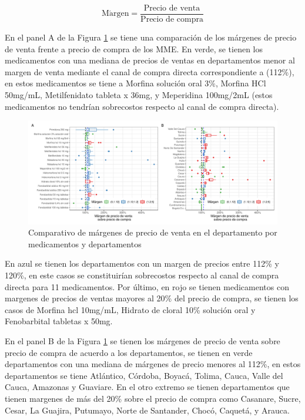 \documentclass[
]{book}
\begin{document}
\[\mathrm{M\acute{a}rgen} = \frac{\text{Precio de venta}}{\text{Precio de compra}}\]

En el panel A de la Figura \ref{fig:boxplotComparativoPVTA} se tiene una comparación de los márgenes de precio de venta frente a precio de compra de los MME. En verde, se tienen los medicamentos con una mediana de precios de ventas en departamentos menor al margen de venta mediante el canal de compra directa correspondiente a (112\%), en estos medicamentos se tiene a Morfina solución oral 3\%, Morfina HCl 50mg/mL, Metilfenidato tableta x 36mg, y Meperidina 100mg/2mL (estos medicamentos no tendrían sobrecostos respecto al canal de compra directa).

\begin{figure}[t]
\includegraphics[width=1\linewidth]{InformeFinal_files/figure-latex/boxplotComparativoPVTA-1} \caption{Comparativo de márgenes de precio de venta en el departamento por medicamentos y departamentos}\label{fig:boxplotComparativoPVTA}
\end{figure}

En azul se tienen los departamentos con un margen de precios entre 112\% y 120\%, en este casos se constituirían sobrecostos respecto al canal de compra directa para 11 medicamentos. Por último, en rojo se tienen medicamentos con margenes de precios de ventas mayores al 20\% del precio de compra, se tienen los casos de Morfina hcl 10mg/mL, Hidrato de cloral 10\% solución oral y Fenobarbital tabletas x 50mg.

En el panel B de la Figura \ref{fig:boxplotComparativoPVTA} se tienen los márgenes de precio de venta sobre precio de compra de acuerdo a los departamentos, se tienen en verde departamentos con una mediana de márgenes de precio menores al 112\%, en estos departamentos se tiene Atlántico, Córdoba, Boyacá, Tolima, Cauca, Valle del Cauca, Amazonas y Guaviare. En el otro extremo se tienen departamentos que tienen margenes de más del 20\% sobre el precio de compra como Casanare, Sucre, Cesar, La Guajira, Putumayo, Norte de Santander, Chocó, Caquetá, y Arauca.
\end{document}
